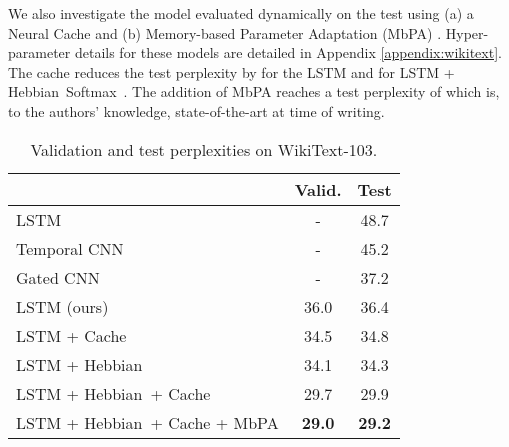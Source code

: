\documentclass{article} \usepackage{hyperref}
\newcommand{\model}{\hbox{Hebbian Softmax }}
\newcommand{\shortmodel}{\hbox{Hebbian }}
\begin{document}
We also investigate the model evaluated dynamically on the test using (a) a Neural Cache \citep{grave2016improving} and (b) Memory-based Parameter Adaptation (MbPA) \citep{sprechmann2018memorybased}. Hyper-parameter details for these models are detailed in Appendix \ref{appendix:wikitext}. The cache reduces the test perplexity by  for the LSTM and  for LSTM + \model. The addition of MbPA reaches a test perplexity of  which is, to the authors' knowledge, state-of-the-art at time of writing.
\begin{table}
    \centering
    \caption{Validation and test perplexities on WikiText-103.}
    \begin{tabular}{lc c}
    \toprule
    & Valid. & Test \\
    \midrule
    LSTM \cite{graves2014neural} & - & 48.7 \\
    Temporal CNN \cite{bai2018convolutional} & - & 45.2 \\
    Gated CNN \cite{dauphin2016language} & - & 37.2 \\ 
    LSTM (ours) & 36.0 & 36.4 \\
    LSTM + Cache & 34.5 & 34.8 \\
    LSTM  + \shortmodel & 34.1 & 34.3 \\
    LSTM + \shortmodel + Cache & 29.7 & 29.9 \\ 
    LSTM + \shortmodel + Cache + MbPA & \textbf{29.0} & \textbf{29.2} \\
    \bottomrule
    \end{tabular}
    \label{tab:wiki}
\end{table}
\end{document}
